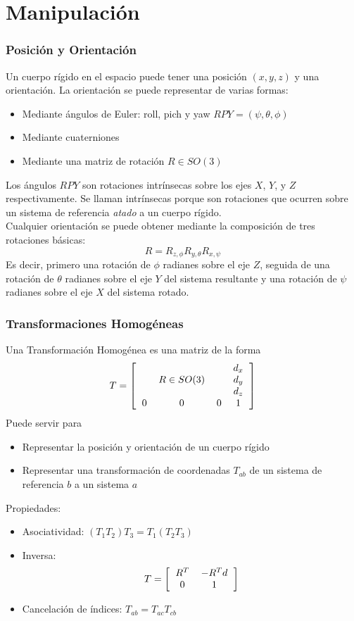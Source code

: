 
\section{Manipulación}

\begin{frame}\frametitle{Posición y Orientación}
  Un cuerpo rígido en el espacio puede tener una posición $(x,y,z)$ y una orientación. La orientación se puede representar de varias formas:
  \begin{itemize}
  \item Mediante ángulos de Euler: roll, pich y yaw $RPY = (\psi, \theta, \phi)$
  \item Mediante cuaterniones
  \item Mediante una matriz de rotación $R \in SO(3)$
  \end{itemize}
  Los ángulos $RPY$ son rotaciones intrínsecas sobre los ejes $X$, $Y$, y $Z$ respectivamente. Se llaman intrínsecas porque son rotaciones que ocurren sobre un sistema de referencia \textit{atado} a un cuerpo rígido.\\
  Cualquier orientación se puede obtener mediante la composición de tres rotaciones básicas:
  \[R = R_{z,\phi}R_{y,\theta}R_{x,\psi}\]
  Es decir, primero una rotación de $\phi$ radianes sobre el eje $Z$, seguida de una rotación de $\theta$ radianes sobre el eje $Y$ del sistema resultante y una rotación de $\psi$ radianes sobre el eje $X$ del sistema rotado. 
\end{frame}

\begin{frame}\frametitle{Transformaciones Homogéneas}
  Una Transformación Homogénea es una matriz de la forma
  \[T = \left[\begin{tabular}{cccc}
      & & & $d_x$\\
      & $R\in SO(3)$ & & $d_y$\\
      & & & $d_z$\\
      0 & 0& 0 & 1
    \end{tabular}\right]\]
  Puede servir para
  \begin{itemize}
  \item Representar la posición y orientación de un cuerpo rígido
  \item Representar una transformación de coordenadas $T_{ab}$ de un sistema de referencia $b$ a un sistema $a$
  \end{itemize}
  Propiedades:
  \begin{itemize}
  \item Asociatividad: $(T_1 T_2) T_3 = T_1 (T_2 T_3)$
  \item Inversa:
    \[T = \left[\begin{tabular}{cc}
       $R^T$ & $-R^T d$\\
       0 & 1
      \end{tabular}\right]\]
  \item Cancelación de índices: $T_{ab} = T_{ac}T_{cb}$
  \end{itemize}
\end{frame}

